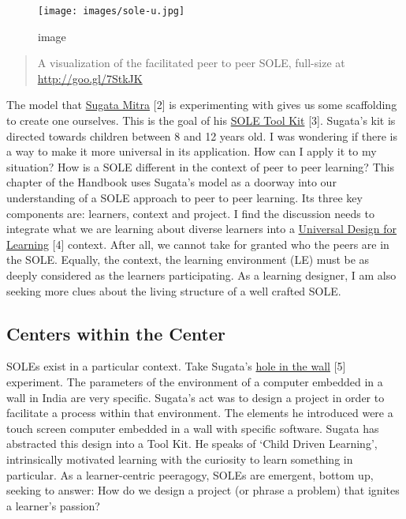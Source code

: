 \begin{figure}
\centering
\texttt{[image: images/sole-u.jpg]}
\caption{image}
\end{figure}

\begin{quote}
A visualization of the facilitated peer to peer SOLE, full-size at
\url{http://goo.gl/7StkJK}
\end{quote}

The model that \href{http://sugatam.wikispaces.com/}{Sugata Mitra}
{{[}2{]}} is experimenting with gives us some scaffolding to create one
ourselves. This is the goal of his
\href{http://www.ted.com/pages/sole_toolkit}{SOLE Tool Kit} {{[}3{]}}.
Sugata's kit is directed towards children between 8 and 12 years old. I
was wondering if there is a way to make it more universal in its
application. How can I apply it to my situation? How is a SOLE different
in the context of peer to peer learning? This chapter of the Handbook
uses Sugata's model as a doorway into our understanding of a SOLE
approach to peer to peer learning. Its three key components are:
learners, context and project. I find the discussion needs to integrate
what we are learning about diverse learners into a
\href{http://www.udlcenter.org/aboutudl/udlguidelines}{Universal Design
for Learning} {{[}4{]}} context. After all, we cannot take for granted
who the peers are in the SOLE. Equally, the context, the learning
environment (LE) must be as deeply considered as the learners
participating. As a learning designer, I am also seeking more clues
about the living structure of a well crafted SOLE.

\hypertarget{centers-within-the-center}{%
\subsection{Centers within the Center}\label{centers-within-the-center}}

SOLEs exist in a particular context. Take Sugata's
\href{http://www.ted.com/talks/sugata_mitra_shows_how_kids_teach_themselves.html}{hole
in the wall} {{[}5{]}} experiment. The parameters of the environment of
a computer embedded in a wall in India are very specific. Sugata's act
was to design a project in order to facilitate a process within that
environment. The elements he introduced were a touch screen computer
embedded in a wall with specific software. Sugata has abstracted this
design into a Tool Kit. He speaks of `Child Driven Learning',
intrinsically motivated learning with the curiosity to learn something
in particular. As a learner-centric peeragogy, SOLEs are emergent,
bottom up, seeking to answer: How do we design a project (or phrase a
problem) that ignites a learner's passion?

